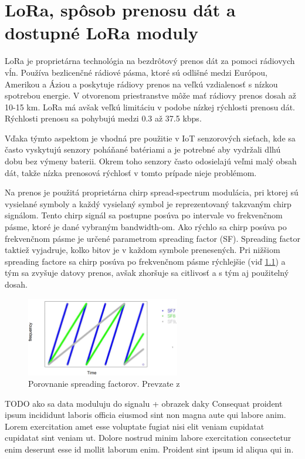 \documentclass[slovak,master]{diploma}
\begin{document}
\chapter{LoRa, spôsob prenosu dát a dostupné LoRa moduly }
LoRa je proprietárna technológia na bezdrôtový prenos dát za pomoci rádiovych vĺn.
Používa bezlicenčné rádiové pásma, ktoré sú odlišné medzi Európou, Amerikou a Áziou a poskytuje rádiovy prenos na veľkú vzdialenosť s nízkou spotrebou energie.
V otvorenom priestranstve môže mať rádiovy prenos dosah až 10-15 km. LoRa má avšak veľkú limitáciu v podobe nízkej rýchlosti prenosu dát.
Rýchlosti prenosu sa pohybujú medzi 0.3 až 37.5 kbps.

Vďaka týmto aspektom je vhodná pre použitie v IoT senzorových sieťach, kde sa často vyskytujú senzory poháňané batériami a je potrebné aby vydržali dlhú dobu 
bez výmeny baterii.  Okrem toho senzory často odosielajú veľmi malý obsah dát, takže nízka prenosová rýchlosť v tomto prípade nieje problémom.

Na prenos je použitá proprietárna chirp spread-spectrum modulácia, pri ktorej sú 
vysielané symboly a každý vysielaný symbol je reprezentovaný takzvaným chirp signálom. Tento chirp signál sa postupne posúva po intervale 
vo frekvenčnom pásme, ktoré je dané vybraným bandwidth-om. 
Ako rýchlo sa chirp posúva po frekvenčnom pásme je určené parametrom spreading factor (SF). Spreading factor taktiež vyjadruje, kolko bitov je v každom 
symbole prenesených. Pri nižšiom spreading factore sa chirp posúva po frekvenčnom pásme rýchlejšie (viď \ref{fig:spreadingfactors}) a tým sa zvyšuje datovy prenos, 
avšak zhoršuje sa citlivosť a s tým aj použitelný dosah.
\newpage

\begin{figure}
	\centering
	\includegraphics[width=0.6\textwidth]{Figures/spreading factors.png}
	\caption{Porovnanie spreading factorov. Prevzate z \cite{spreadfactorimage}}
	\label{fig:spreadingfactors}
\end{figure}

TODO ako sa data moduluju do signalu + obrazek daky
Consequat proident ipsum incididunt laboris officia eiusmod sint non magna aute qui labore anim. Lorem exercitation amet esse voluptate fugiat 
nisi elit veniam cupidatat cupidatat sint veniam ut. Dolore nostrud minim labore exercitation consectetur enim deserunt esse id mollit laborum enim. 
Proident sint ipsum id aliqua qui in.
\end{document}
